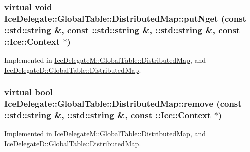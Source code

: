 \hypertarget{class_ice_delegate_1_1_global_table_1_1_distributed_map_a41847e7af4589564ef39469d2628a09c}{
\subsubsection[{putNget}]{\setlength{\rightskip}{0pt plus 5cm}virtual void IceDelegate::GlobalTable::DistributedMap::putNget (const ::std::string \&, \/  const ::std::string \&, \/  ::std::string \&, \/  const ::Ice::Context $\ast$)}}
\label{class_ice_delegate_1_1_global_table_1_1_distributed_map_a41847e7af4589564ef39469d2628a09c}


Implemented in \hyperlink{class_ice_delegate_m_1_1_global_table_1_1_distributed_map_adc403dbc33076ea6b12c26992aba5026}{IceDelegateM::GlobalTable::DistributedMap}, and \hyperlink{class_ice_delegate_d_1_1_global_table_1_1_distributed_map_a3a757d412fceeec2cbc53baa79f417fe}{IceDelegateD::GlobalTable::DistributedMap}.

\hypertarget{class_ice_delegate_1_1_global_table_1_1_distributed_map_aa0616738a0cfb246e9e9921629c8dbd3}{
\subsubsection[{remove}]{\setlength{\rightskip}{0pt plus 5cm}virtual bool IceDelegate::GlobalTable::DistributedMap::remove (const ::std::string \&, \/  ::std::string \&, \/  const ::Ice::Context $\ast$)}}
\label{class_ice_delegate_1_1_global_table_1_1_distributed_map_aa0616738a0cfb246e9e9921629c8dbd3}


Implemented in \hyperlink{class_ice_delegate_m_1_1_global_table_1_1_distributed_map_a12d1244d77d87ecc420b3fb020f22af4}{IceDelegateM::GlobalTable::DistributedMap}, and \hyperlink{class_ice_delegate_d_1_1_global_table_1_1_distributed_map_a6b2ca81f9b87def03aee564bed45a8a5}{IceDelegateD::GlobalTable::DistributedMap}.


